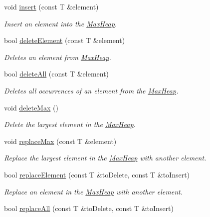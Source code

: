 \begin{DoxyCompactItemize}
void \hyperlink{class_max_heap_ab44116cd54d2caa1307df0d073e67514}{insert} (const T \&element)
\begin{DoxyCompactList}\small\item\em Insert an element into the \hyperlink{class_max_heap}{Max\+Heap}. \end{DoxyCompactList}\item 
bool \hyperlink{class_max_heap_a86b8d8285cf18a32544fe4777f9abbbb}{delete\+Element} (const T \&element)
\begin{DoxyCompactList}\small\item\em Deletes an element from \hyperlink{class_max_heap}{Max\+Heap}. \end{DoxyCompactList}\item 
bool \hyperlink{class_max_heap_afb84751d5d8f891260a4e30bdc2d2c38}{delete\+All} (const T \&element)
\begin{DoxyCompactList}\small\item\em Deletes all occurrences of an element from the \hyperlink{class_max_heap}{Max\+Heap}. \end{DoxyCompactList}\item 
\mbox{\label{class_max_heap_a039088e9eb3b7a9f478b9c011b1183b1}} 
void \hyperlink{class_max_heap_a039088e9eb3b7a9f478b9c011b1183b1}{delete\+Max} ()
\begin{DoxyCompactList}\small\item\em Delete the largest element in the \hyperlink{class_max_heap}{Max\+Heap}. \end{DoxyCompactList}\item 
void \hyperlink{class_max_heap_a1c3366efa7a0b61ed484fa7266c37bf9}{replace\+Max} (const T \&element)
\begin{DoxyCompactList}\small\item\em Replace the largest element in the \hyperlink{class_max_heap}{Max\+Heap} with another element. \end{DoxyCompactList}\item 
bool \hyperlink{class_max_heap_a3ce799416b9373ec7a9f1fe2739812f1}{replace\+Element} (const T \&to\+Delete, const T \&to\+Insert)
\begin{DoxyCompactList}\small\item\em Replace an element in the \hyperlink{class_max_heap}{Max\+Heap} with another element. \end{DoxyCompactList}\item 
bool \hyperlink{class_max_heap_a9dd0757fb97c89db9a68604cf45e4ff0}{replace\+All} (const T \&to\+Delete, const T \&to\+Insert)

\end{DoxyCompactItemize}
